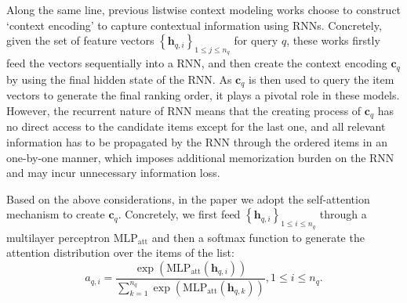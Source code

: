 \documentclass[letterpaper]{article} %
\begin{document}
Along the same line, previous listwise context modeling works \cite{ai2018learning,DCM} choose to construct `context encoding' to capture contextual information using RNNs. Concretely, given the set of feature vectors ${{\left\{ {{\mathbf{h}}_{q,i}} \right\}}_{1\le j\le {{n}_{q}}}}$ for query $q$, these works firstly feed the vectors sequentially into a RNN, and then create the context encoding  ${{\mathbf{c}}_{q}}$ by using the final hidden state of the RNN. As ${{\mathbf{c}}_{q}}$ is then used to query the item vectors to generate the final ranking order, it plays a pivotal role in these models. However, the recurrent nature of RNN means that the creating process of ${{\mathbf{c}}_{q}}$ has no direct access to the candidate items except for the last one, and all relevant information has to be propagated by the RNN through the ordered items in an one-by-one manner, which imposes additional memorization burden on the RNN and may incur unnecessary information loss.


Based on the above considerations, in the paper we adopt the self-attention mechanism \cite{lin2017structured,vaswani2017attention} to create ${{\mathbf{c}}_{q}}$. Concretely, we first feed ${{\left\{ {{\mathbf{h}}_{q,i}} \right\}}_{1\le i\le {{n}_{q}}}}$ through a multilayer perceptron $\text{ML}{{\text{P}}_{\text{att}}}$ and then a softmax function to generate the attention distribution over the items of the list:
\begin{equation}
\label{attweight}
{{a}_{q,i}}=\frac{\exp \left( \text{ML}{{\text{P}}_{\text{att}}}\left( {{\mathbf{h}}_{q,i}} \right) \right)}{\sum\limits_{k=1}^{{{n}_{q}}}{\exp \left( \text{ML}{{\text{P}}_{\text{att}}}\left( {{\mathbf{h}}_{q,k}} \right) \right)}},1\le i\le n_{q}.
\end{equation}
\end{document}
